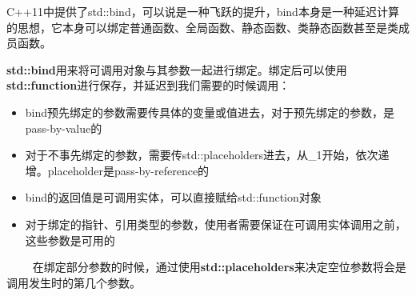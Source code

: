 \documentclass[UTF8,a4paper,12pt]{ctexbook}
\begin{document}
		C++11中提供了std::bind，可以说是一种飞跃的提升，bind本身是一种延迟计算的思想，它本身可以绑定普通函数、全局函数、静态函数、类静态函数甚至是类成员函数。
		
		\textbf{std::bind}用来将可调用对象与其参数一起进行绑定。绑定后可以使用\textbf{std::function}进行保存，并延迟到我们需要的时候调用：
			
			\begin{itemize}
				\item bind预先绑定的参数需要传具体的变量或值进去，对于预先绑定的参数，是pass-by-value的
				\item 对于不事先绑定的参数，需要传std::placeholders进去，从\_1开始，依次递增。placeholder是pass-by-reference的
				\item bind的返回值是可调用实体，可以直接赋给std::function对象
				\item 对于绑定的指针、引用类型的参数，使用者需要保证在可调用实体调用之前，这些参数是可用的
			\end{itemize}
		　
		　在绑定部分参数的时候，通过使用\textbf{std::placeholders}来决定空位参数将会是调用发生时的第几个参数。
\end{document}
